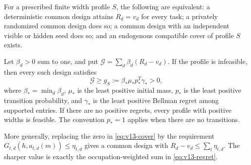 \begin{theorem}\label{thm:v13-endogenous}
For a prescribed finite width profile $S$, the following are equivalent:
a deterministic common design attains $R_d=v_d$ for every task;
a privately randomized common design does so;
a common design with an independent visible or hidden seed does so;
and an endogenous compatible cover of profile $S$ exists.

Let $\beta_d>0$ sum to one, and put
$\mathcal G=\sum_d\beta_d(R_d-v_d)$. If the profile is infeasible,
then every such design satisfies
\begin{equation}\label{eq:v13-gap}
 \mathcal G\ge g_S:=\beta_*\mu_*p_*^T\gamma_*>0,
\end{equation}
where $\beta_*=\min_d\beta_d$, $\mu_*$ is the least positive initial
mass, $p_*$ is the least positive transition probability, and
$\gamma_*$ is the least positive Bellman regret among supported entries.
If there are no positive regrets, every profile with positive widths is
feasible. The convention $p_*=1$ applies when there are no transitions.

More generally, replacing the zero in \eqref{eq:v13-cover} by the
requirement $G_{t,d}(h,a_{t,d}(m))\le\eta_{t,d}$ gives a common design
with $R_d-v_d\le\sum_t\eta_{t,d}$. The sharper value is exactly the
occupation-weighted sum in \eqref{eq:v13-regret}.
\end{theorem}
